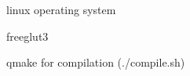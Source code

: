 
\begin{DoxyItemize}
\item linux operating system
\item freeglut3
\item qmake for compilation (./compile.sh) 
\end{DoxyItemize}